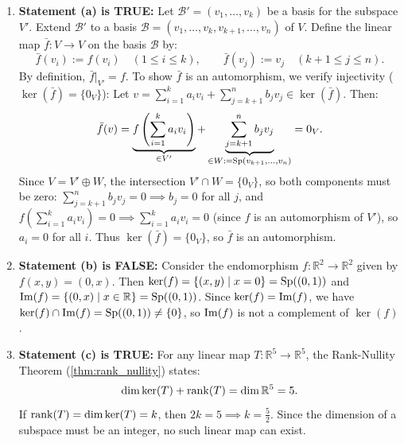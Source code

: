 \begin{exercisesolution}
\label{sol:endomorphism_properties_true_false}
\begin{enumerate}[label=\textbf{(\alph*)}]
    \item \textbf{Statement (a) is TRUE:}
    Let $\mathcal{B}' = (v_1, \dots, v_k)$ be a basis for the subspace $V'$. Extend $\mathcal{B}'$ to a basis $\mathcal{B} = (v_1, \dots, v_k, v_{k+1}, \dots, v_n)$ of $V$.
    Define the linear map $\bar{f} \colon V \to V$ on the basis $\mathcal{B}$ by:
    \[
    \bar{f}(v_i) := f(v_i) \quad (1 \le i \le k), \qquad \bar{f}(v_j) := v_j \quad (k+1 \le j \le n).
    \]
    By definition, $\bar{f}|_{V'} = f$. To show $\bar{f}$ is an automorphism, we verify injectivity ($\ker(\bar{f}) = \{0_V\}$):
    Let $v = \sum_{i=1}^k a_i v_i + \sum_{j=k+1}^n b_j v_j \in \ker(\bar{f})$. Then:
    \[
    \bar{f}(v) = \underbrace{f\left(\sum_{i=1}^k a_i v_i\right)}_{\in V'} + \underbrace{\sum_{j=k+1}^n b_j v_j}_{\in W := \operatorname{Sp}(v_{k+1}, \dots, v_n)} = 0_V.
    \]
    Since $V = V' \oplus W$, the intersection $V' \cap W = \{0_V\}$, so both components must be zero:
    $\sum_{j=k+1}^n b_j v_j = 0 \implies b_j = 0$ for all $j$, and $f(\sum_{i=1}^k a_i v_i) = 0 \implies \sum_{i=1}^k a_i v_i = 0$ (since $f$ is an automorphism of $V'$), so $a_i = 0$ for all $i$.
    Thus $\ker(\bar{f}) = \{0_V\}$, so $\bar{f}$ is an automorphism.

    \item \textbf{Statement (b) is FALSE:}
    Consider the endomorphism $f \colon \mathbb{R}^2 \to \mathbb{R}^2$ given by $f(x, y) = (0, x)$.
    Then $\ker(f) = \{(x, y) \mid x = 0\} = \operatorname{Sp}((0, 1))$ and $\operatorname{Im}(f) = \{(0, x) \mid x \in \mathbb{R}\} = \operatorname{Sp}((0, 1))$.
    Since $\ker(f) = \operatorname{Im}(f)$, we have $\ker(f) \cap \operatorname{Im}(f) = \operatorname{Sp}((0, 1)) \ne \{0\}$, so $\operatorname{Im}(f)$ is not a complement of $\ker(f)$.

    \item \textbf{Statement (c) is TRUE:}
    For any linear map $T \colon \mathbb{R}^5 \to \mathbb{R}^5$, the Rank-Nullity Theorem (\cref{thm:rank_nullity}) states:
    \[
    \dim \ker(T) + \operatorname{rank}(T) = \dim \mathbb{R}^5 = 5.
    \]
    If $\operatorname{rank}(T) = \dim \ker(T) = k$, then $2k = 5 \implies k = \frac{5}{2}$. Since the dimension of a subspace must be an integer, no such linear map can exist.
\end{enumerate}
\end{exercisesolution}

